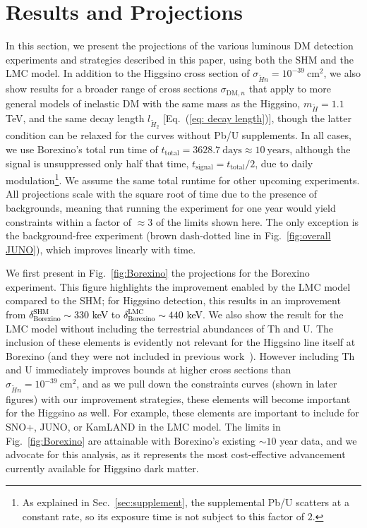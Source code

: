\documentclass[aps,prd,amsmath,amssymb,10pt,letterpaper,balancelastpage,showpacs,superscriptaddress,nofootinbib,floatfix,notitlepage,longbibliography,twocolumn
]{revtex4-2}
\newcommand{\numcolor}[1]{\textcolor{black}{#1}}
\newcommand{\Eq}[1]{Eq.~(#1)}
\newcommand{\sxN}{\sigma_{\Ht n}}
\newcommand{\mx}{m_{\Ht}}
\newcommand{\ttotal}{t_{\text{total}}}
\newcommand{\tsignal}{t_{\text{signal}}}
\newcommand{\Ht}{\tilde{H}}
\newcommand{\lH}{l_{\tilde{H}_2}}
\begin{document}
\section{Results and Projections\label{sec:projection}}
In this section, we present the projections of the various luminous DM detection experiments and strategies described in this paper, using both the SHM and the LMC model. In addition to the Higgsino cross section of $\sxN=10^{-39}~\text{cm}^2$, we also show results for a broader range of cross sections $\sigma_{\text{DM},n}$ that apply to more general models of inelastic DM with the same mass as the Higgsino, $\mx=1.1$ TeV, and the same decay length $\lH$ [\Eq{\ref{eq: decay length}}], though the latter condition can be relaxed for the curves without Pb/U supplements. In all cases, we use Borexino's total run time of $\ttotal=3628.7~\text{days}\approx 10~\text{years}$, although the signal is unsuppressed only half that time, $\tsignal = \ttotal/2$, due to daily modulation\footnote{As explained in Sec.~\ref{sec:supplement}, the supplemental Pb/U scatters at a constant rate, so its exposure time is not subject to this factor of $2$.}. We assume the same total runtime for other upcoming experiments. All projections scale with the square root of time due to the presence of backgrounds, meaning that running the experiment for one year would yield constraints within a factor of $\approx 3$ of the limits shown here. The only exception is the background-free experiment (brown dash-dotted line in Fig.~\ref{fig:overall JUNO}), which improves linearly with time.

We first present in Fig.~\ref{fig:Borexino} the projections for the Borexino experiment. This figure highlights the improvement enabled by the LMC model compared to the SHM; for Higgsino detection, this results in an improvement from \numcolor{$\delta^{\text{SHM}}_{\text{Borexino}}\sim 330$ keV} to \numcolor{$\delta^{\text{LMC}}_{\text{Borexino}} \sim 440 $ keV}. We also show the result for the LMC model without including the terrestrial abundances of Th and U.  The inclusion of these elements is evidently not relevant for the Higgsino line itself at Borexino (and they were not included in previous work~\cite{Luminous}). However including Th and U immediately improves bounds at higher cross sections than $\sxN=10^{-39}~\text{cm}^2$, and as we pull down the constraints curves (shown in later figures) with our improvement strategies, these elements will become important for the Higgsino as well.  For example, these elements are important to include for SNO+, JUNO, or KamLAND in the LMC model.
The limits in Fig.~\ref{fig:Borexino} are attainable with Borexino's existing $\sim 10$ year data, and we advocate for this analysis, as it represents the most cost-effective advancement currently available for Higgsino dark matter.
\end{document}
